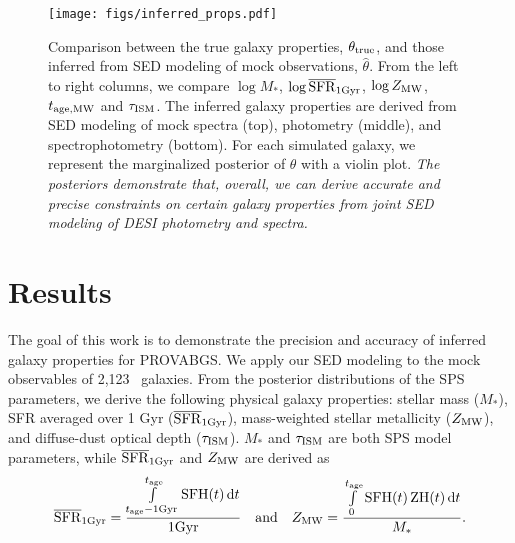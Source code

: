 \begin{figure}
\begin{center}
\texttt{[image: figs/inferred\_props.pdf]}
\caption{
    Comparison between the true galaxy properties, $\theta_{\rm true}$, and
    those inferred from SED modeling of mock observations, $\hat{\theta}$. 
    From the left to right columns, we compare $\log M_*$, $\log \overline{\rm SFR}_{\rm 1Gyr}$, 
    $\log Z_{\rm MW}$, $t_{\rm age, MW}$ and $\tau_{\rm ISM}$. 
    The inferred galaxy properties are derived from SED modeling of mock
    spectra (top), photometry (middle), and spectrophotometry (bottom). 
    For each simulated galaxy, we represent the marginalized posterior of
    $\theta$ with a violin plot.  %
    \emph{The posteriors demonstrate that, overall, we can derive accurate and 
    precise constraints on certain galaxy properties from joint SED modeling of
    DESI photometry and spectra.}
    } \label{fig:prop_inf}
\end{center}
\end{figure}

\section{Results} \label{sec:results}
The goal of this work is to demonstrate the precision and accuracy of inferred
galaxy properties for PROVABGS. 
We apply our SED modeling to the mock observables of 2,123 \lgal~galaxies.
From the posterior distributions of the SPS parameters, we derive the following
physical galaxy properties: stellar mass ($M_*$), SFR averaged over 1 Gyr
($\overline{\rm SFR}_{\rm 1Gyr}$), mass-weighted stellar metallicity ($Z_{\rm MW}$), and diffuse-dust
optical depth ($\tau_{\rm ISM}$).
$M_*$ and $\tau_{\rm ISM}$ are both SPS model parameters, while $\overline{\rm SFR}_{\rm 1Gyr}$ and
$Z_{\rm MW}$ are derived as 
\begin{equation} \label{eq:prop_eqs}
    \avgsfr = \frac{\int\limits_{t_{\rm age} - {\rm 1 Gyr}}^{t_{\rm age}}{\rm
    SFH}(t)\,{\rm d}t}{{\rm 1 Gyr}} \quad{\rm and}\quad
    Z_{\rm MW} = \frac{\int\limits_0^{t_{\rm age}}{\rm SFH}(t)\,{\rm
    ZH}(t)\,{\rm d}t}{M_*}.
\end{equation} 


